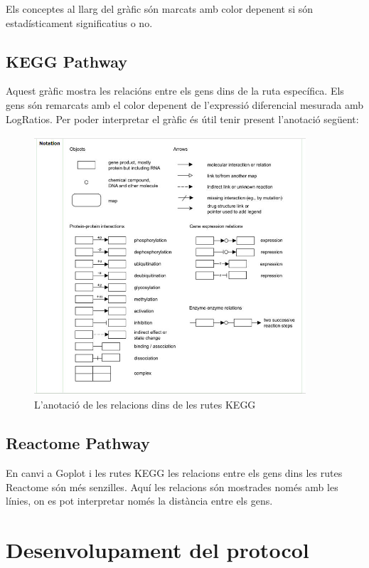 Els conceptes al llarg del gràfic són marcats amb color depenent si són estadísticament significatius o no.

\subsection{KEGG Pathway}
Aquest gràfic mostra les relacións entre els gens dins de la ruta específica. Els gens són remarcats amb el color depenent de l'expressió diferencial mesurada amb LogRatios. Per poder interpretar el gràfic és útil tenir present l'anotació següent:

\begin{figure}[H]
\centering
\includegraphics[width=0.9\textwidth]{figures/Annotation_KEGG.jpg} 
\caption{L'anotació de les relacions dins de les rutes KEGG}
\end{figure}

\subsection{Reactome Pathway}
En canvi a Goplot i les rutes KEGG les relacions entre els gens dins les rutes Reactome són més senzilles. Aquí les relacions són mostrades només amb les línies, on es pot interpretar només la distància entre els gens. 


\section{Desenvolupament del protocol}

